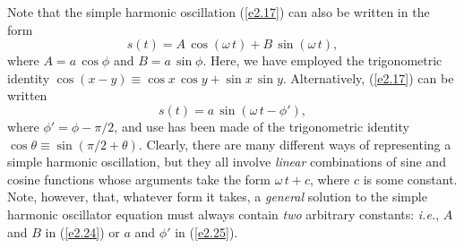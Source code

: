 Note that the simple harmonic oscillation (\ref{e2.17}) can also
be written in the form
\begin{equation}\label{e2.24}
s(t) = A\,\cos(\omega\,t) + B\,\sin(\omega\,t),
\end{equation}
where $A= a\,\cos\phi$ and $B=a\,\sin\phi$. Here, we have employed the trigonometric identity $\cos(x-y) \equiv \cos x\,\cos y+\sin x\,\sin y$. 
Alternatively, (\ref{e2.17}) can be written
\begin{equation}\label{e2.25}
s(t) = a\,\sin(\omega\,t-\phi'),
\end{equation}
where $\phi'=\phi-\pi/2$, and use has been made of the trigonometric
identity $\cos\theta \equiv \sin(\pi/2+\theta)$. Clearly, there are many different
ways of representing a simple harmonic oscillation, but they all involve
{\em linear}\/ combinations of sine and cosine functions whose arguments
take the form $\omega\,t+c$, where $c$ is some constant. Note, however, that,
whatever form it takes, 
a {\em general}\/ solution to the simple harmonic oscillator equation must always contain {\em two}\/ arbitrary constants: {\em i.e.}, $A$ and $B$ in (\ref{e2.24}) or
$a$ and $\phi'$ in (\ref{e2.25}).

